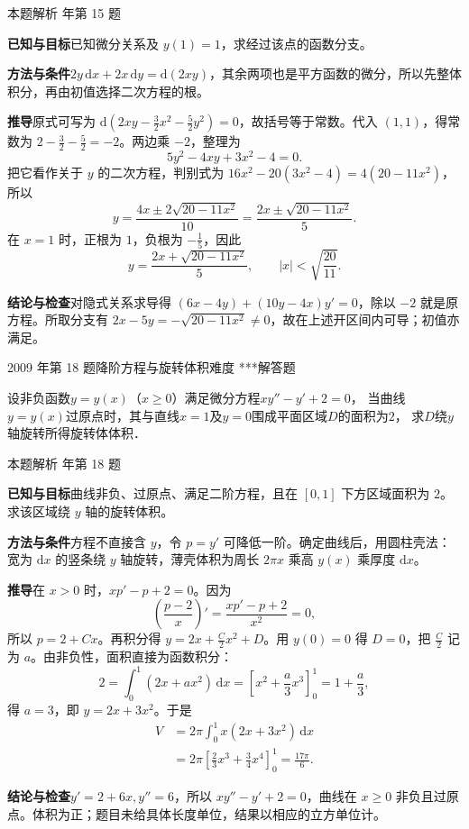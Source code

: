 \documentclass[UTF8,zihao=-4,fontset=fandol]{ctexart}
\newcounter{BankQuestion}
\newcommand{\QuestionPage}[7]{%
  \stepcounter{BankQuestion}%
  \par\noindent\begin{minipage}{\linewidth}
  \raggedright
  {\small\textcolor{black!60}{#3\quad #5\quad 难度 #7}\hfill\textcolor{accent}{#2}}\par\smallskip}
\newcommand{\QuestionEnd}{\end{minipage}\par\medskip}
\newcommand{\QuestionPage}[7]{%
  \clearpage
  \stepcounter{BankQuestion}%
  {\small\textcolor{accent}{#1\hfill #2}}\par\medskip
  {\small\textcolor{black!60}{#3\quad #5\quad 难度 #7\hfill \arabic{BankQuestion} / 234}}\par\vspace{9bp}}
\newcommand{\QuestionEnd}{}
\newenvironment{QuestionSolution}[1]{%
  \clearpage
  {\small\textcolor{black!60}{本题解析\quad #1}}\par\medskip
}{\par\clearpage}
\begin{document}
\begin{QuestionSolution}{2025 年第 15 题}
\textbf{已知与目标}\quad 已知微分关系及 \(y(1)=1\)，求经过该点的函数分支。

\textbf{方法与条件}\quad \(2y\,\mathrm{d}x+2x\,\mathrm{d}y=\mathrm{d}(2xy)\)，其余两项也是平方函数的微分，所以先整体积分，再由初值选择二次方程的根。

\textbf{推导}\quad 原式可写为 \(\mathrm{d}(2xy-\frac{3}{2}x^2-\frac{5}{2}y^2)=0\)，故括号等于常数。代入 \((1,1)\)，得常数为 \(2-\frac{3}{2}-\frac{5}{2}=-2\)。两边乘 \(-2\)，整理为
\[
5y^2-4xy+3x^2-4=0.
\]
把它看作关于 \(y\) 的二次方程，判别式为 \(16x^2-20(3x^2-4)=4(20-11x^2)\)，所以
\[
y=\frac{4x\pm2\sqrt{20-11x^2}}{10}
=\frac{2x\pm\sqrt{20-11x^2}}{5}.
\]
在 \(x=1\) 时，正根为 \(1\)，负根为 \(-\frac{1}{5}\)，因此
\[
\boxed{y=\frac{2x+\sqrt{20-11x^2}}{5}},\qquad |x|<\sqrt{\frac{20}{11}}.
\]

\textbf{结论与检查}\quad 对隐式关系求导得 \((6x-4y)+(10y-4x)y'=0\)，除以 \(-2\) 就是原方程。所取分支有 \(2x-5y=-\sqrt{20-11x^2}\ne0\)，故在上述开区间内可导；初值亦满足。
\end{QuestionSolution}

\QuestionPage{4.1 几类简单的微分方程}{解答题}{2009 年第 18 题}{3}{降阶方程与旋转体积}{208 / 234}{***}
设非负函数$y = y(x)$（$x \ge 0$）满足微分方程$xy'' - y' + 2 = 0$，
当曲线$y = y(x)$过原点时，其与直线$x = 1$及$y = 0$围成平面区域$D$的面积为$2$，
求$D$绕$y$轴旋转所得旋转体体积．
\QuestionEnd

\begin{QuestionSolution}{2009 年第 18 题}
\textbf{已知与目标}\quad 曲线非负、过原点、满足二阶方程，且在 \([0,1]\) 下方区域面积为 \(2\)。求该区域绕 \(y\) 轴的旋转体积。

\textbf{方法与条件}\quad 方程不直接含 \(y\)，令 \(p=y'\) 可降低一阶。确定曲线后，用圆柱壳法：宽为 \(\mathrm{d}x\) 的竖条绕 \(y\) 轴旋转，薄壳体积为周长 \(2\pi x\) 乘高 \(y(x)\) 乘厚度 \(\mathrm{d}x\)。

\textbf{推导}\quad 在 \(x>0\) 时，\(xp'-p+2=0\)。因为
\[
\left(\frac{p-2}{x}\right)'=\frac{xp'-p+2}{x^2}=0,
\]
所以 \(p=2+Cx\)。再积分得 \(y=2x+\frac{C}{2}x^2+D\)。用 \(y(0)=0\) 得 \(D=0\)，把 \(\frac{C}{2}\) 记为 \(a\)。由非负性，面积直接为函数积分：
\[
2=\int_0^1(2x+ax^2)\,\mathrm{d}x
=\left[x^2+\frac{a}{3}x^3\right]_0^1=1+\frac{a}{3},
\]
得 \(a=3\)，即 \(y=2x+3x^2\)。于是
\[
\begin{aligned}
V&=2\pi\int_0^1x(2x+3x^2)\,\mathrm{d}x\\
&=2\pi\left[\frac{2}{3}x^3+\frac{3}{4}x^4\right]_0^1
=\boxed{\frac{17\pi}{6}}.
\end{aligned}
\]

\textbf{结论与检查}\quad \(y'=2+6x,y''=6\)，所以 \(xy''-y'+2=0\)，曲线在 \(x\ge0\) 非负且过原点。体积为正；题目未给具体长度单位，结果以相应的立方单位计。
\end{QuestionSolution}
\end{document}
